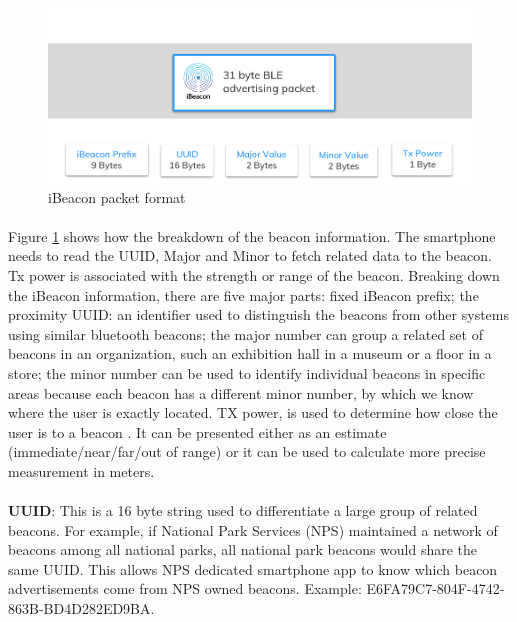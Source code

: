 \documentclass[12pt]{article}
\begin{document}
\begin{figure}[H]
	\centering
	\includegraphics[width=1.0\linewidth]{media/ibeacon-format.jpg}
	\caption{iBeacon packet format}
	\label{fig:iBPacket}
\end{figure} 

\paragraph{}Figure \ref{fig:iBPacket} shows how the breakdown of the beacon information. The smartphone needs to read the UUID, Major and Minor to fetch related data to the beacon. Tx power is associated with the strength or range of the beacon. Breaking down the iBeacon information, there are five major parts: fixed iBeacon prefix; the proximity UUID: an identifier used to distinguish the beacons from other systems using similar bluetooth beacons; the major number can group a related set of beacons in an organization, such an exhibition hall in a museum or a floor in a store; the minor number can be used to identify individual beacons in specific areas because each beacon has a different minor number, by which we know where the user is exactly located. TX power, is used to determine how close the user is to a beacon \cite{beacons}. It can be presented either as an estimate (immediate/near/far/out of range) or it can be used to calculate more precise measurement in meters.
%


\paragraph{} 
\textbf{UUID}: This is a 16 byte string used to differentiate a large group of related beacons. For example, if National Park Services (NPS) maintained a network of beacons among all national parks, all national park beacons would share the same UUID. This allows NPS dedicated smartphone app to know which beacon advertisements come from NPS owned beacons. Example: E6FA79C7-804F-4742-863B-BD4D282ED9BA. \\
\end{document}
